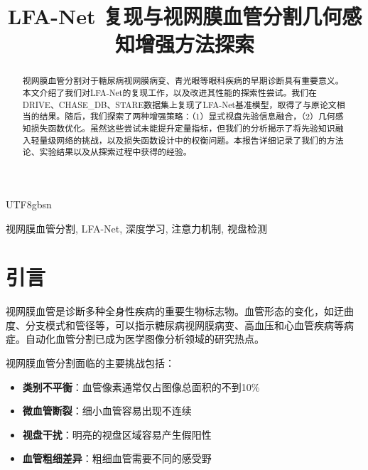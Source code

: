 \documentclass[conference]{IEEEtran}
\begin{document}
\begin{CJK}{UTF8}{gbsn}

\renewcommand{\abstractname}{摘要}
\renewcommand{\IEEEkeywordsname}{关键词}

\title{LFA-Net 复现与视网膜血管分割几何感知增强方法探索}

\author{
}

\maketitle


\begin{abstract}
\normalsize
视网膜血管分割对于糖尿病视网膜病变、青光眼等眼科疾病的早期诊断具有重要意义。本文介绍了我们对LFA-Net的复现工作，以及改进其性能的探索性尝试。我们在DRIVE、CHASE\_DB、STARE数据集上复现了LFA-Net基准模型，取得了与原论文相当的结果。随后，我们探索了两种增强策略：（1）显式视盘先验信息融合，（2）几何感知损失函数优化。虽然这些尝试未能提升定量指标，但我们的分析揭示了将先验知识融入轻量级网络的挑战，以及损失函数设计中的权衡问题。本报告详细记录了我们的方法论、实验结果以及从探索过程中获得的经验。
\end{abstract}

\begin{IEEEkeywords}
\normalsize
视网膜血管分割, LFA-Net, 深度学习, 注意力机制, 视盘检测
\end{IEEEkeywords}

\section{引言}

视网膜血管是诊断多种全身性疾病的重要生物标志物。血管形态的变化，如迂曲度、分支模式和管径等，可以指示糖尿病视网膜病变、高血压和心血管疾病等病症\cite{staal2004ridge}。自动化血管分割已成为医学图像分析领域的研究热点。

视网膜血管分割面临的主要挑战包括：
\begin{itemize}
    \item \textbf{类别不平衡}：血管像素通常仅占图像总面积的不到10\%
    \item \textbf{微血管断裂}：细小血管容易出现不连续
    \item \textbf{视盘干扰}：明亮的视盘区域容易产生假阳性
    \item \textbf{血管粗细差异}：粗细血管需要不同的感受野
\end{itemize}


\end{CJK}
\end{document}
